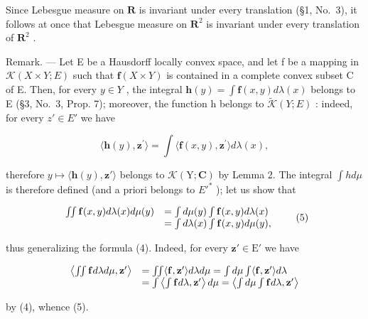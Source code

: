 Since Lebesgue measure on \(\mathbf{R}\) is invariant under every translation (§1, No.~3), it follows at once that Lebesgue measure on \(\mathbf{R}^2\) is invariant under every translation of \(\mathbf{R}^2\) .

Remark. --- Let E be a Hausdorff locally convex space, and let f be a mapping in \(\mathcal{K}(X \times Y; E)\) such that \(\mathbf{f}(X \times Y)\) is contained in a complete convex subset C of E. Then, for every \(y \in Y\) , the integral \(\mathbf{h}(y) = \int \mathbf{f}(x, y) d\lambda(x)\) belongs to E (§3, No.~3, Prop. 7); moreover, the function h belongs to \(\widetilde{\mathcal{K}}(Y; E)\) : indeed, for every \(z' \in E'\) we have

\[
\langle \mathbf {h} (y), \mathbf {z} ^ {\prime} \rangle = \int \langle \mathbf {f} (x, y), \mathbf {z} ^ {\prime} \rangle d \lambda (x),
\]

therefore \(y \mapsto \langle \mathbf{h}(y), \mathbf{z}' \rangle\) belongs to \(\mathcal{K}(\mathrm{Y}; \mathbf{C})\) by Lemma 2. The integral \(\int h d\mu\) is therefore defined (and a priori belongs to \(E'^{*}\) ); let us show that

\[
\begin{array}{r l} \iint \mathbf {f} (x, y) d \lambda (x) d \mu (y) & = \int d \mu (y) \int \mathbf {f} (x, y) d \lambda (x) \\ & = \int d \lambda (x) \int \mathbf {f} (x, y) d \mu (y), \end{array}\tag{5}
\]

thus generalizing the formula (4). Indeed, for every \(\mathbf{z}' \in \mathrm{E}'\) we have

\[
\begin{array}{r l} \left\langle \iint \mathbf {f} d \lambda d \mu , \mathbf {z} ^ {\prime} \right\rangle & = \iint \langle \mathbf {f}, \mathbf {z} ^ {\prime} \rangle d \lambda d \mu = \int d \mu \int \langle \mathbf {f}, \mathbf {z} ^ {\prime} \rangle d \lambda \\ & = \int \left\langle \int \mathbf {f} d \lambda , \mathbf {z} ^ {\prime} \right\rangle d \mu = \left\langle \int d \mu \int \mathbf {f} d \lambda , \mathbf {z} ^ {\prime} \right\rangle \end{array}
\]

by (4), whence (5).

